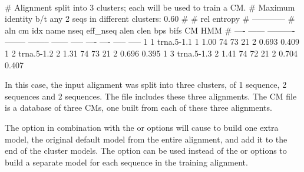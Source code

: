 {\samepage
{}\\

\begin{sreoutput}
# Alignment split into 3 clusters; each will be used to train a CM.
# Maximum identity b/t any 2 seqs in different clusters: 0.60
#
#                                                                           rel entropy
#                                                                          ------------
#  aln  cm idx  name            nseq  eff_nseq    alen   clen   bps  bifs     CM    HMM
# ----  ------  ----------  --------  --------  ------  -----  ----  ----  -----  -----
     1       1  trna.5-1.1         1      1.00      74     73    21     2  0.693  0.409
     1       2  trna.5-1.2         2      1.31      74     73    21     2  0.696  0.395
     1       3  trna.5-1.3         2      1.41      74     72    21     2  0.704  0.407
\end{sreoutput}
}

In this case, the input alignment was split into three
clusters, of 1 sequence, 2 sequences and 2 sequences. The file
 includes these three alignments. The CM file
 is a database of three CMs, one built from
each of these three alignments. 

The  option in combination with the  or
 options will cause  to build one extra
model, the original default model from the entire alignment, and add
it to the end of the cluster models. The  option can be
used instead of the  or  options to
build a separate model for each sequence in the training alignment.

